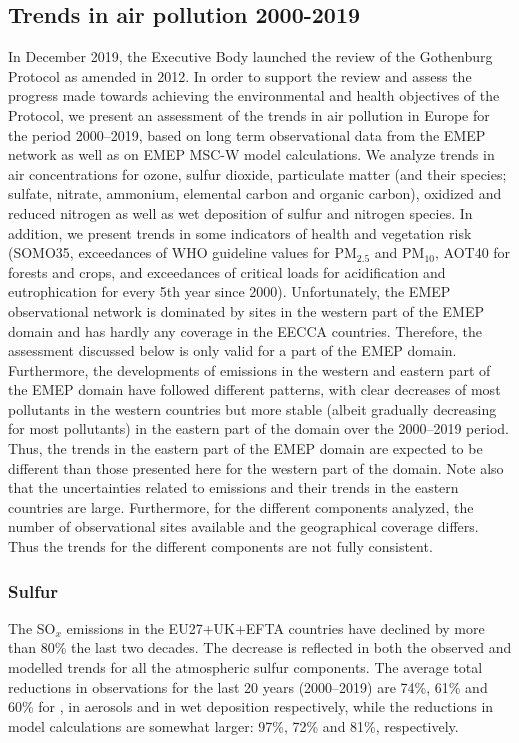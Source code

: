 \subsection*{Trends in air pollution 2000-2019}
In December 2019, the Executive Body launched the review of the Gothenburg Protocol as amended in 2012. In order to support the review and assess the progress made towards achieving the environmental and health objectives of the Protocol, we present an assessment of the trends in air pollution in Europe for the period 2000--2019, based on long term observational data from the EMEP network as well as on EMEP MSC-W model calculations.
We analyze trends in air concentrations for ozone, sulfur dioxide, particulate matter (and their species; sulfate, nitrate, ammonium, elemental carbon and organic carbon), oxidized and reduced nitrogen as well as wet deposition of sulfur and nitrogen species. In addition, we present trends in some indicators of health and vegetation risk (SOMO35, exceedances of WHO guideline values for PM$_{2.5}$ and PM$_{10}$, AOT40 for forests and crops, and exceedances of critical loads for acidification and eutrophication for every 5th year since 2000).
Unfortunately, the EMEP observational network is dominated by sites in the western part of the EMEP domain and has hardly any coverage in the EECCA countries. Therefore, the assessment discussed below is only valid for a part of the EMEP domain. Furthermore, the developments of emissions in the western and eastern part of the EMEP domain have followed different patterns, with clear decreases of most pollutants in the western countries but more stable (albeit gradually decreasing for most pollutants) in the eastern part of the domain over the 2000--2019 period. Thus, the trends in the eastern part of the EMEP domain are expected to be different than those presented here for the western part of the domain. Note also that the uncertainties related to emissions and their trends in the eastern countries are large.
Furthermore, for the different components analyzed, the number of observational sites available and the geographical coverage differs. Thus the trends for the different components are not fully consistent. 

\subsubsection*{Sulfur}
The SO$_x$ emissions in the EU27+UK+EFTA countries have declined by more than 80\% 
the last two decades. The decrease is reflected in both the observed and modelled trends for all the atmospheric sulfur components. The average total reductions in observations for the last 20 years (2000--2019) are 74\%, 61\% and 60\% for \soii, \soiv in aerosols and in wet deposition respectively, while the reductions in model calculations are somewhat larger: 97\%, 72\% and 81\%, respectively. 


